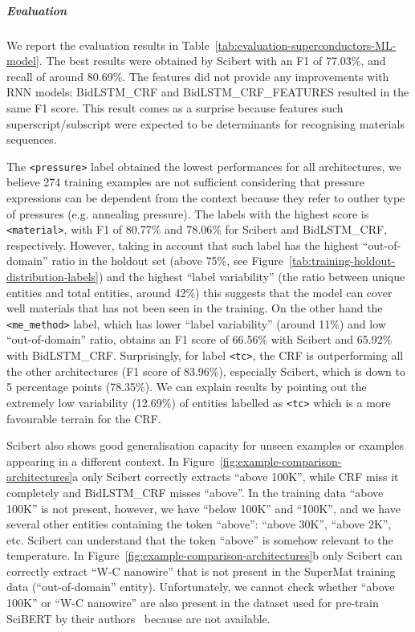 \documentclass{article}
\begin{document}
\subparagraph{Evaluation}

We report the evaluation results in Table~\ref{tab:evaluation-superconductors-ML-model}. 
The best results were obtained by Scibert with an F1 of 77.03\%, and recall of around 80.69\%. 
The features did not provide any improvements with RNN models: BidLSTM\_CRF and BidLSTM\_CRF\_FEATURES resulted in the same F1 score.
This result comes as a surprise because features such superscript/subscript were expected to be determinants for recognising materials sequences. 

The \texttt{<pressure>} label obtained the lowest performances for all architectures, we believe 274 training examples are not sufficient considering that pressure expressions can be dependent from the context because they refer to outher type of pressures (e.g. annealing pressure).
The labels with the highest score is \texttt{<material>}, with F1 of 80.77\% and 78.06\% for Scibert and BidLSTM\_CRF, respectively. However, taking in account that such label has the highest ``out-of-domain'' ratio in the holdout set (above 75\%, see Figure~\ref{tab:training-holdout-distribution-labels}) and the highest ``label variability'' (the ratio between unique entities and total entities, around 42\%) this suggests that the model can cover well materials that has not been seen in the training. 
On the other hand the \texttt{<me\_method>} label, which has lower ``label variability'' (around 11\%) and low ``out-of-domain'' ratio, obtains an F1 score of 66.56\% with Scibert and 65.92\% with BidLSTM\_CRF.
Surprisingly, for label \texttt{<tc>}, the CRF is outperforming all the other architectures (F1 score of 83.96\%), especially Scibert, which is down to 5 percentage points (78.35\%). We can explain results by pointing out the extremely low variability (12.69\%) of entities labelled as \texttt{<tc>} which is a more favourable terrain for the CRF. %

Scibert also shows good generalisation capacity for unseen examples or examples appearing in a different context. 
In Figure~\ref{fig:example-comparison-architectures}a only Scibert correctly extracts ``above 100K'', while CRF miss it completely and BidLSTM\_CRF misses ``above''. 
In the training data ``above 100K'' is not present, however, we have ``below 100K'' and ``\~100K'', and we have several other entities containing the token ``above'': ``above 30K'', ``above 2K'', etc. 
Scibert can understand that the token ``above'' is somehow relevant to the temperature. 
In Figure~\ref{fig:example-comparison-architectures}b only Scibert can correctly extract ``W-C nanowire'' that is not present in the SuperMat training data (``out-of-domain'' entity). 
Unfortunately, we cannot check whether ``above 100K'' or ``W-C nanowire'' are also present in the dataset used for pre-train SciBERT by their authors~\cite{Beltagy2019SciBERT} because are not available. 
\end{document}
